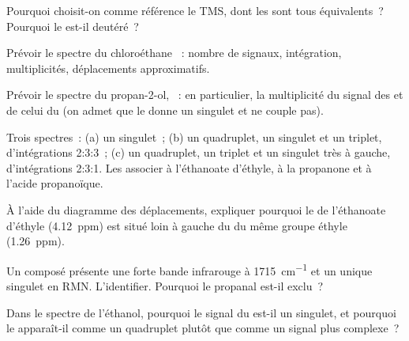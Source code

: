 \begin{exercise}[$\star$]\label{exo:g12:proton-nmr:5}
Pourquoi choisit-on comme référence le TMS, dont les  sont tous
équivalents~? Pourquoi le  est-il deutéré~?
\end{exercise}

\begin{exercise}[$\star\star$]\label{exo:g12:proton-nmr:6}
Prévoir le spectre du chloroéthane ~: nombre de signaux,
intégration, multiplicités, déplacements approximatifs.
\end{exercise}

\begin{exercise}[$\star\star$]\label{exo:g12:proton-nmr:7}
Prévoir le spectre du propan-2-ol, ~: en particulier, la
multiplicité du signal des  et de celui du  (on admet que
le  donne un singulet et ne couple pas).
\end{exercise}

\begin{exercise}[$\star\star$]\label{exo:g12:proton-nmr:8}
Trois spectres~: (a) un singulet~; (b) un quadruplet, un singulet et un
triplet, d'intégrations 2:3:3~; (c) un quadruplet, un triplet et un
singulet très à gauche, d'intégrations 2:3:1. Les associer à l'éthanoate
d'éthyle, à la propanone et à l'acide propanoïque.
\end{exercise}

\begin{exercise}[$\star\star$]\label{exo:g12:proton-nmr:9}
À l'aide du diagramme des déplacements, expliquer pourquoi le 
de l'éthanoate d'éthyle (\qty{4.12}{ppm}) est situé loin à gauche du
 du même groupe éthyle (\qty{1.26}{ppm}).
\end{exercise}

\begin{exercise}[$\star\star$]\label{exo:g12:proton-nmr:10}
Un composé  présente une forte bande infrarouge à
\qty{1715}{cm^{-1}} et un unique singulet en RMN. L'identifier. Pourquoi
le propanal est-il exclu~?
\end{exercise}

\begin{exercise}[$\star\star$]\label{exo:g12:proton-nmr:11}
Dans le spectre de l'éthanol, pourquoi le signal du  est-il un
singulet, et pourquoi le  apparaît-il comme un quadruplet plutôt
que comme un signal plus complexe~?
\end{exercise}


